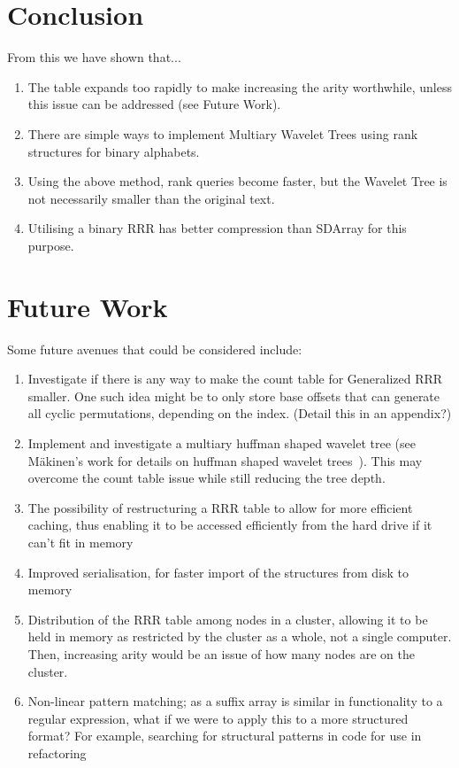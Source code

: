 \section{Conclusion}
From this we have shown that...
\begin{enumerate}
\item
 	The table expands too rapidly to make increasing the arity worthwhile,
	unless this issue can be addressed (see Future Work).
\item
	There are simple ways to implement Multiary Wavelet Trees using rank
	structures for binary alphabets.
\item
	Using the above method, rank queries become faster, but the Wavelet Tree is 
	not necessarily smaller than the original text.
\item
	Utilising a binary RRR has better compression than SDArray for this purpose.
\end{enumerate}

\section{Future Work}
Some future avenues that could be considered include:

\begin{enumerate}
\item
	Investigate if there is any way to make the count table for Generalized RRR 
	smaller. One such idea might be to only store base offsets that can generate
	all cyclic permutations, depending on the index. (Detail this in an 
	appendix?)
	
\item
	Implement and investigate a multiary huffman shaped wavelet tree (see 
	M\"{a}kinen's work for details on huffman shaped wavelet
	trees~\cite{huffmanWT:makinen2005}). This may
	overcome the count table issue while still reducing the tree depth.

\item
	The possibility of restructuring a RRR table to allow for more
    efficient caching, thus enabling it to be accessed efficiently from the
	hard drive if it can't fit in memory

\item
	Improved serialisation, for faster import of the structures from disk to
	memory

\item
	Distribution of the RRR table among nodes in a cluster, allowing it to be
	held in memory as restricted by the cluster as a whole, not a single
	computer. Then, increasing arity would be an issue of how many nodes are
	on the cluster.

\item
	Non-linear pattern matching; as a suffix array is similar in functionality
	to a regular expression, what if we were to apply this to a more 
	structured format? For example, searching for structural patterns in code
	for use in refactoring
\end{enumerate}